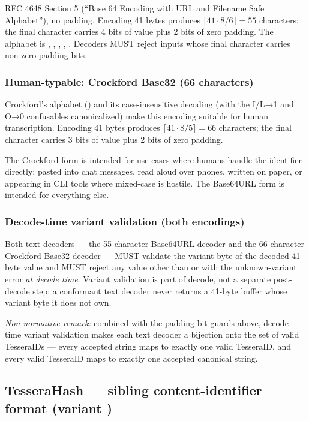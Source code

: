 RFC 4648 Section 5 (``Base 64 Encoding with URL and Filename Safe Alphabet''), no padding. Encoding 41 bytes produces $\lceil 41 \cdot 8 / 6 \rceil = 55$ characters; the final character carries 4 bits of value plus 2 bits of zero padding. The alphabet is , , , \code{-}, \code{\_}. Decoders MUST reject inputs whose final character carries non-zero padding bits.

\subsubsection{Human-typable: Crockford Base32 (66 characters)}

Crockford's alphabet () and its case-insensitive decoding (with the I/L→1 and O→0 confusables canonicalized) make this encoding suitable for human transcription. Encoding 41 bytes produces $\lceil 41 \cdot 8 / 5 \rceil = 66$ characters; the final character carries 3 bits of value plus 2 bits of zero padding.

The Crockford form is intended for use cases where humans handle the identifier directly: pasted into chat messages, read aloud over phones, written on paper, or appearing in CLI tools where mixed-case is hostile. The Base64URL form is intended for everything else.

\subsubsection{Decode-time variant validation (both encodings)}
\label{sec:decode-variant-contract}

Both text decoders --- the 55-character Base64URL decoder and the 66-character Crockford Base32 decoder --- MUST validate the variant byte of the decoded 41-byte value and MUST reject any value other than  or  with the unknown-variant error \emph{at decode time}. Variant validation is part of decode, not a separate post-decode step: a conformant text decoder never returns a 41-byte buffer whose variant byte it does not own.

\emph{Non-normative remark:} combined with the padding-bit guards above, decode-time variant validation makes each text decoder a bijection onto the set of valid TesseraIDs --- every accepted string maps to exactly one valid TesseraID, and every valid TesseraID maps to exactly one accepted canonical string.

\subsection{TesseraHash --- sibling content-identifier format (variant )}
\label{sec:tessera_hash}


